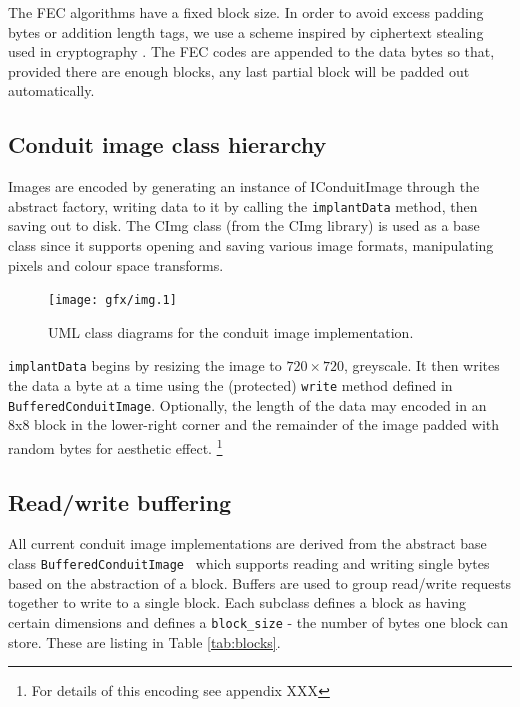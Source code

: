 The FEC algorithms have a fixed block size. In order to avoid excess padding bytes or addition length tags, we use a scheme inspired by ciphertext stealing used in cryptography \cite{stealing}. The FEC codes are appended to the data bytes so that, provided there are enough blocks, any last partial block will be padded out automatically.


\FloatBarrier
\subsection{Conduit image class hierarchy}

Images are encoded by generating an instance of IConduitImage through the abstract factory, writing data to it by calling the {\tt implantData} method, then saving out to disk. The CImg class (from the CImg library) is used as a base class since it supports opening and saving various image formats, manipulating pixels and colour space transforms.

    \begin{figure}[tbp]
        \begin{center}
                \texttt{[image: gfx/img.1]}
            \caption{UML class diagrams for the conduit image implementation.}
            \label{uml:img-classes}
        \end{center}
    \end{figure}
    
{\tt implantData} begins by resizing the image to $720 \times 720$, greyscale. It then writes the data a byte at a time using the (protected) {\tt write} method defined in {\tt BufferedConduitImage}. Optionally, the length of the data may encoded in an 8x8 block in the lower-right corner and the remainder of the image padded with random bytes for aesthetic effect. \footnote{For details of this encoding see appendix XXX}


\FloatBarrier
\subsection{Read/write buffering}

All current conduit image implementations are derived from the abstract base class {\tt BufferedConduitImage } which supports reading and writing single bytes based on the abstraction of a block. Buffers are used to group read/write requests together to write to a single block. Each subclass defines a block as having certain dimensions and defines a {\tt block\_size} - the number of bytes one block can store. These are listing in Table \ref{tab:blocks}.

